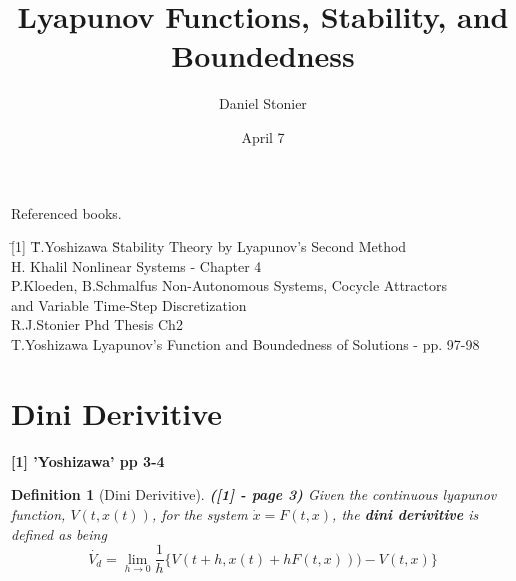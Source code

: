 
\parskip 3mm
\parindent 0mm

\newlength{\widen} \newlength{\heighten}

\setlength{\widen}{0.45in}
\setlength{\heighten}{0.45in}

\addtolength{\oddsidemargin}{-\widen}
\addtolength{\evensidemargin}{-\widen}
\addtolength{\textwidth}{2\widen}
\addtolength{\topmargin}{-\heighten}
\addtolength{\textheight}{2\heighten}

\addtolength{\oddsidemargin}{+0.5in}
\addtolength{\evensidemargin}{-0.5in}

\title{Lyapunov Functions, Stability, and Boundedness}
\author{Daniel Stonier}
\date{April 7}

\newtheorem{defn}{Definition}[section]
\newtheorem{eg}{Example}[section]
\newtheorem{therm}{Theorem}[section]




\maketitle

Referenced books.
\begin{tabbing}
  \hspace{1cm} \= [1] \= T.Yoshizawa \hspace{1.7cm} \= Stability Theory by
  Lyapunov's Second Method \\
  \> [2] \> H. Khalil \> Nonlinear Systems - Chapter 4\\
  \> [3] \> P.Kloeden, B.Schmalfus \> Non-Autonomous Systems,  Cocycle
  		Attractors \\
  \> \> \>  and Variable Time-Step Discretization \\
  \> [4] \> R.J.Stonier \> Phd Thesis Ch2 \\
  \> [5] \> T.Yoshizawa \> Lyapunov's Function and Boundedness of Solutions -
  		pp. 97-98\\

\end{tabbing}

\section{Dini Derivitive}

{\bf [1] 'Yoshizawa' pp 3-4}

\begin{defn}[Dini Derivitive]
  {\bf ([1] - page 3)}
  Given the continuous lyapunov function, $V(t,x(t))$, for the system
  $\dot{x} = F(t,x)$, the {\bf dini derivitive} is defined as being
  \[ \dot{V_{d}} = \lim_{h \rightarrow 0} \frac{1}{h} \{
                             V(t+h,x(t)+hF(t,x))) - V(t,x) \} \]
  \end{defn}

